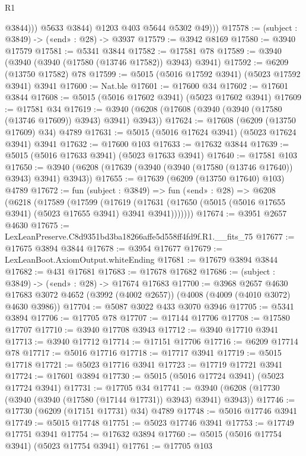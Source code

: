 \begin{lexlean}{R1}
\begin{coremodule}
                  @3844)))
            @5633
            @3844)
          @1203
          @403
          @5644
          @5302
          @49)))
@17578 := (subject : @3849) -> («end» : @28) -> @3937
@17579 := @3942 @8169
@17580 := @3940 @17579
@17581 := @5341 @3844
@17582 := @17581 @78
@17589 := @3940 (@3940 (@3940 (@17580 (@13746 @17582)) @3943) @3941)
@17592 := @6209 (@13750 @17582) @78
@17599 := @5015 (@5016 @17592 @3941) (@5023 @17592 @3941) @3941
@17600 := Nat.ble
@17601 := @17600 @34
@17602 := @17601 @3844
@17608 := @5015 (@5016 @17602 @3941) (@5023 @17602 @3941)
@17609 := @17581 @34
@17619 := @3940 (@6208 (@17608 (@3940 (@3940 (@17580 (@13746 @17609)) @3943) @3941) @3943))
@17624 := @17608 (@6209 (@13750 @17609) @34) @4789
@17631 := @5015 (@5016 @17624 @3941) (@5023 @17624 @3941) @3941
@17632 := @17600 @103
@17633 := @17632 @3844
@17639 := @5015 (@5016 @17633 @3941) (@5023 @17633 @3941)
@17640 := @17581 @103
@17650 := @3940 (@6208 (@17639 (@3940 (@3940 (@17580 (@13746 @17640)) @3943) @3941) @3943))
@17655 := @17639 (@6209 (@13750 @17640) @103) @4789
@17672 := fun (subject : @3849) =>
  fun («end» : @28) =>
  @6208
    (@6218
      (@17589
        (@17599
          (@17619
            (@17631 (@17650 (@5015 (@5016 @17655 @3941) (@5023 @17655 @3941) @3941 @3941)))))))
@17674 := @3951 @2657 @4630
@17675 := LexLeanPreserve.C8d9351bd3ba18266affe5d558ff4fd9f.R1.__fits_75
@17677 := @17675 @3894 @3844
@17678 := @3954 @17677
@17679 := LexLeanBoot.AxiomOutput.whiteEnding
@17681 := @17679 @3894 @3844
@17682 := @431 @17681
@17683 := @17678 @17682
@17686 := (subject : @3849) -> («end» : @28) -> @17674 @17683
@17700 := @3968
    @2657
    @4630
    @17683
    @3072
    @4652
    (@3992 (@4002 @2657))
    (@4008 (@4009 (@4010 @3072) @4630 @3986))
@17704 := @5087 @3022 @433 @3070 @3946
@17705 := @5341 @3894
@17706 := @17705 @78
@17707 := @17144 @17706
@17708 := @17580 @17707
@17710 := @3940 @17708 @3943
@17712 := @3940 @17710 @3941
@17713 := @3940 @17712
@17714 := @17151 @17706
@17716 := @6209 @17714 @78
@17717 := @5016 @17716
@17718 := @17717 @3941
@17719 := @5015 @17718
@17721 := @5023 @17716 @3941
@17723 := @17719 @17721 @3941
@17724 := @17601 @3894
@17730 := @5015 (@5016 @17724 @3941) (@5023 @17724 @3941)
@17731 := @17705 @34
@17741 := @3940 (@6208 (@17730 (@3940 (@3940 (@17580 (@17144 @17731)) @3943) @3941) @3943))
@17746 := @17730 (@6209 (@17151 @17731) @34) @4789
@17748 := @5016 @17746 @3941
@17749 := @5015 @17748
@17751 := @5023 @17746 @3941
@17753 := @17749 @17751 @3941
@17754 := @17632 @3894
@17760 := @5015 (@5016 @17754 @3941) (@5023 @17754 @3941)
@17761 := @17705 @103

\end{coremodule}
\end{lexlean}
